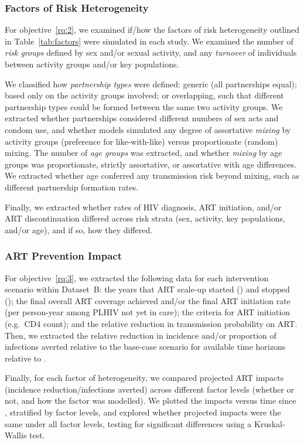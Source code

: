 \subsubsection{Factors of Risk Heterogeneity}
\label{sss:meth:factors}
For objective~\ref{rq:2}, we examined if/how
the factors of risk heterogeneity outlined in Table~\ref{tab:factors}
were simulated in each study.
We examined the number of \emph{risk groups} defined by sex and/or sexual activity, and
any \emph{turnover} of individuals between activity groups and/or key populations.
\par
We classified how \emph{partnership types} were defined:
generic (all partnerships equal);
based only on the activity groups involved;
or overlapping, such that different partnership types could be formed between the same two activity groups.
We extracted whether partnerships considered different
numbers of sex acts and condom use,
and whether models simulated any degree of assortative \emph{mixing} by activity groups
(preference for like-with-like) versus proportionate (random) mixing.
The number of \emph{age groups} was extracted, and whether \emph{mixing} by age groups was
proportionate, strictly assortative, or assortative with age differences.
We extracted whether age conferred any transmission risk beyond mixing,
such as different partnership formation rates.
\par
Finally, we extracted whether rates of HIV diagnosis, ART initiation, and/or ART discontinuation
differed across risk strata (sex, activity, key populations, and/or age),
and if so, how they differed.
\subsubsection{ART Prevention Impact}
\label{sss:meth:api}
For objective~\ref{rq:3}, we extracted
the following data for each intervention scenario within Dataset~B:
the years that ART scale-up started () and stopped ();
the final overall ART coverage achieved and/or
the final ART initiation rate (per person-year among PLHIV not yet in care);
the criteria for ART initiation (e.g.\ CD4 count); and
the relative reduction in transmission probability on ART.
Then, we extracted the
relative reduction in incidence and/or proportion of infections averted
relative to the base-case scenario for available time horizons relative to .
\par
Finally, for each factor of heterogeneity,
we compared projected ART impacts (incidence reduction/infections averted)
across different factor levels (whether or not, and how the factor was modelled).
We plotted the impacts versus time since , stratified by factor levels,
and explored whether projected impacts were the same under all factor levels,
testing for significant differences using a Kruskal-Wallis test.

